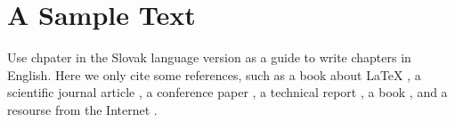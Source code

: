 \chapter{A Sample Text}

Use chpater in the Slovak language version as a guide
to write chapters in English. Here we only cite some references, such
as a book about LaTeX \cite{Oetiker2000}, a scientific journal article
\cite{clanok}, a conference paper \cite{clanok_na_konferencii}, a
technical report \cite{technical_report}, a book \cite{kniha}, and a
resourse from the Internet \cite{smernica}.
